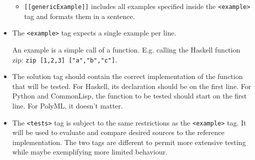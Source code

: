 \documentclass[a4paper,12pt]{article}
\begin{document}
\begin{itemize}
\begin{itemize}
  \item \texttt{[[genericExample]]} includes all examples specified inside the \texttt{<example>} tag and formats them in a sentence.
    
 \end{itemize}
 
 \item The \texttt{<example>} tag expects a single example per line.
 
 An example is a simple call of a function. E.g. calling the Haskell function zip: \texttt{zip [1,2,3] ["a","b","c"]}.
 
 \item The solution tag should contain the correct implementation of the function that will be tested. For Haskell, its declaration should be on the first line. For Python and CommonLisp, the function to be tested should start on the first line. For PolyML, it doesn't matter.

 \item The \texttt{<tests>} tag is subject to the same restrictions as the \texttt{<example>} tag. It will be used to evaluate and compare desired sources to the reference implementation. The two tags are different to permit more extensive testing while maybe exemplifying more limited behaviour.
 
\end{itemize}
\end{document}
